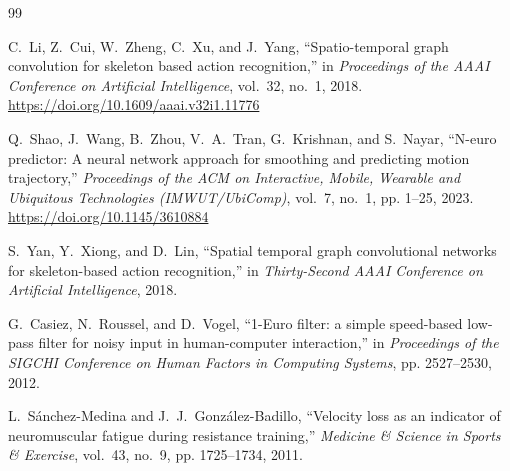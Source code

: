 \documentclass[12pt,a4paper]{report}
\begin{document}
\begin{thebibliography}{99}

C.~Li, Z.~Cui, W.~Zheng, C.~Xu, and J.~Yang,
\newblock ``Spatio-temporal graph convolution for skeleton based action recognition,''
\newblock in \emph{Proceedings of the AAAI Conference on Artificial Intelligence}, vol.~32, no.~1, 2018. \url{https://doi.org/10.1609/aaai.v32i1.11776}

Q.~Shao, J.~Wang, B.~Zhou, V.~A.~Tran, G.~Krishnan, and S.~Nayar,
\newblock ``N-euro predictor: A neural network approach for smoothing and predicting motion trajectory,''
\newblock \emph{Proceedings of the ACM on Interactive, Mobile, Wearable and Ubiquitous Technologies (IMWUT/UbiComp)}, vol.~7, no.~1, pp. 1--25, 2023. \url{https://doi.org/10.1145/3610884}

S.~Yan, Y.~Xiong, and D.~Lin,
\newblock ``Spatial temporal graph convolutional networks for skeleton-based action recognition,''
\newblock in \emph{Thirty-Second AAAI Conference on Artificial Intelligence}, 2018.

G.~Casiez, N.~Roussel, and D.~Vogel,
\newblock ``1-Euro filter: a simple speed-based low-pass filter for noisy input in human-computer interaction,''
\newblock in \emph{Proceedings of the SIGCHI Conference on Human Factors in Computing Systems}, pp. 2527--2530, 2012.

L.~S{\'a}nchez-Medina and J.~J.~Gonz{\'a}lez-Badillo,
\newblock ``Velocity loss as an indicator of neuromuscular fatigue during resistance training,''
\newblock \emph{Medicine \& Science in Sports \& Exercise}, vol.~43, no.~9, pp. 1725--1734, 2011.

\end{thebibliography}
\end{document}
